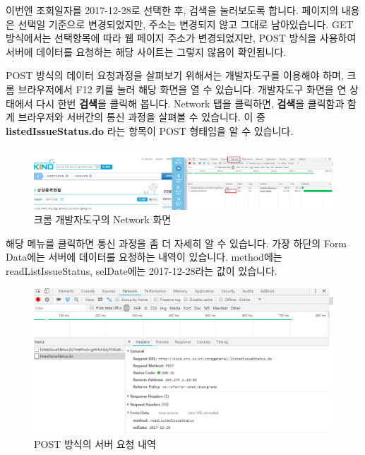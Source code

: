 \documentclass[12pt,]{book}
\begin{document}
이번엔 조회일자를 2017-12-28로 선택한 후, 검색을 눌러보도록 합니다. 페이지의 내용은 선택일 기준으로 변경되었지만, 주소는 변경되지 않고 그대로 남아있습니다. GET 방식에서는 선택항목에 따라 웹 페이지 주소가 변경되었지만, POST 방식을 사용하여 서버에 데이터를 요청하는 해당 사이트는 그렇지 않음이 확인됩니다.

POST 방식의 데이터 요청과정을 살펴보기 위해서는 개발자도구를 이용해야 하며, 크롬 브라우저에서 F12 키를 눌러 해당 화면을 열 수 있습니다. 개발자도구 화면을 연 상태에서 다시 한번 \textbf{검색}을 클릭해 봅니다. Network 탭을 클릭하면, \textbf{검색}을 클릭함과 함게 브라우저와 서버간의 통신 과정을 살펴볼 수 있습니다. 이 중 \textbf{listedIssueStatus.do} 라는 항목이 POST 형태임을 알 수 있습니다.

\begin{figure}[h]

{\centering \includegraphics[width=1\linewidth]{images/crawl_corp_list_2} 

}

\caption{크롬 개발자도구의 Network 화면}\label{fig:unnamed-chunk-6}
\end{figure}

해당 메뉴를 클릭하면 통신 과정을 좀 더 자세히 알 수 있습니다. 가장 하단의 Form Data에는 서버에 데이터를 요청하는 내역이 있습니다. method에는 readListIssueStatus, selDate에는 2017-12-28라는 값이 있습니다.

\begin{figure}[h]

{\centering \includegraphics[width=0.7\linewidth]{images/crawl_corp_list_3} 

}

\caption{POST 방식의 서버 요청 내역}\label{fig:unnamed-chunk-7}
\end{figure}
\end{document}
